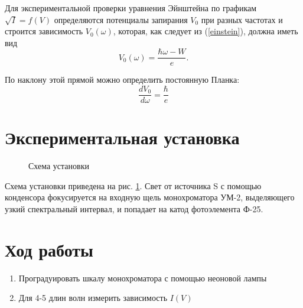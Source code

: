 \documentclass[12pt,a4paper]{article}
\begin{document}
Для экспериментальной проверки уравнения Эйнштейна по графикам $ \sqrt{I} = f(V)$ определяются потенциалы запирания  $V_0$ при разных частотах и строится зависимость $V_0(\omega)$, которая, как следует из (\ref{einstein}), должна иметь вид
\begin{equation}
V_0(\omega) = \frac{ \hbar \omega - W}{e}.
\end{equation}

По наклону этой прямой можно определить постоянную Планка:
\begin{equation}
\frac{dV_0}{d\omega} = \frac{\hbar}{e}
\end{equation}

\section{Экспериментальная установка}

\begin{figure} \label{scheme} 
\caption{Схема установки}
\end{figure}

Схема установки приведена на рис. \ref{scheme}. Свет от источника S с помощью конденсора фокусируется на входную щель монохроматора УМ-2, выделяющего узкий спектральный интервал, и попадает на катод фотоэлемента Ф-25. 

\section{Ход работы}

\begin{enumerate}
\item Проградуировать шкалу монохроматора с помощью неоновой лампы 
\item Для 4-5 длин волн измерить зависимость $I(V)$
\end{enumerate}
\end{document}
